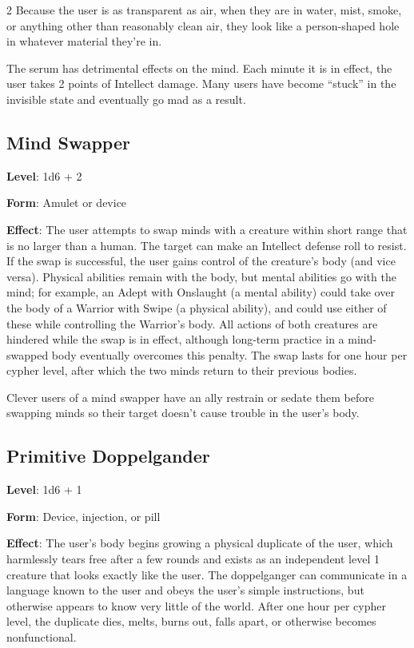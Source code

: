 \begin{multicols}{2}
Because the user is as transparent as air, when they are in water, mist, smoke, or anything other than reasonably clean air, they look like a person-shaped hole in whatever material they’re in.

The serum has detrimental effects on the mind. Each minute it is in effect, the user takes 2 points of Intellect damage. Many users have become “stuck” in the invisible state and eventually go mad as a result.

\subsection{Mind Swapper}

\textbf{Level}: 1d6 + 2

\textbf{Form}: Amulet or device

\textbf{Effect}: The user attempts to swap minds with a creature within short range that is no larger than a human. The target can make an Intellect defense roll to resist. If the swap is successful, the user gains control of the creature’s body (and vice versa). Physical abilities remain with the body, but mental abilities go with the mind; for example, an Adept with Onslaught (a mental ability) could take over the body of a Warrior with Swipe (a physical ability), and could use either of these while controlling the Warrior’s body. All actions of both creatures are hindered while the swap is in effect, although long-term practice in a mind-swapped body eventually overcomes this penalty. The swap lasts for one hour per cypher level, after which the two minds return to their previous bodies.

Clever users of a mind swapper have an ally restrain or sedate them before swapping minds so their target doesn’t cause trouble in the user’s body.

\subsection{Primitive Doppelgander}


\textbf{Level}: 1d6 + 1

\textbf{Form}: Device, injection, or pill

\textbf{Effect}: The user’s body begins growing a physical duplicate of the user, which harmlessly tears free after a few rounds and exists as an independent level 1 creature that looks exactly like the user. The doppelganger can communicate in a language known to the user and obeys the user’s simple instructions, but otherwise appears to know very little of the world. After one hour per cypher level, the duplicate dies, melts, burns out, falls apart, or otherwise becomes nonfunctional.


\end{multicols}
